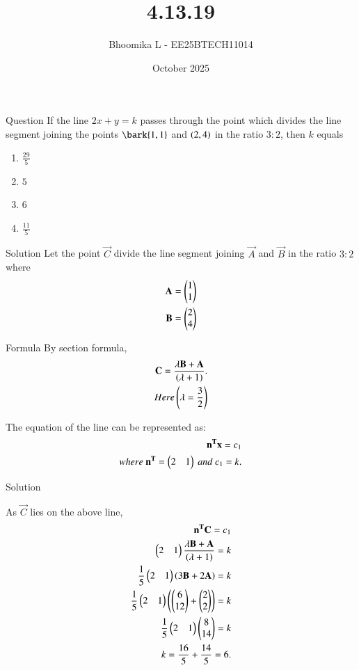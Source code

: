 \documentclass{beamer}
\title %
{4.13.19}
\date{October  2025}
\author %
{Bhoomika L - EE25BTECH11014}
\begin{document}
\frame{\titlepage}
\begin{frame}{Question} If the line $2x + y = k$ passes through the point which divides the line segment joining the points $\bark{1, 1}$ and $\left(2, 4\right)$ in the ratio $3:2$, then $k$ equals
\begin{multicols}
\begin{enumerate}
    \item $\frac{29}{5}$
    \item $5$
    \item $6$
    \item $\frac{11}{5}$
\end{enumerate}
\end{multicols}
\end{frame}

\begin{frame}{Solution}
Let the point $\vec{C}$ divide the line segment joining $\vec{A}$ and $\vec{B}$ in the ratio $3:2$ where
\begin{align}
     \mathbf{A}=\begin{pmatrix}1\\1\end{pmatrix}\\
    \mathbf{B}=\begin{pmatrix}2\\4\end{pmatrix}\\
\end{align}
\end{frame}

\begin{frame}{Formula}
	By section formula,
\begin{align}
   \mathbf{C}=\frac{\lambda\mathbf{B}+\mathbf{A}} {\left(\lambda +1\right)}.\\  
    Here \left(\lambda=\frac{3}{2}\right)
\end{align}

The equation of the line can be represented as:
\begin{align}
    \mathbf{n^T}\mathbf{x}=c_1\\
 where  \ \mathbf{n^T}=\begin{pmatrix}2&1\end{pmatrix} \ and \ c_1=k.
\end{align}
\end{frame}

\begin{frame}{Solution}

As $\vec{C}$ lies on the above line,
\begin{align}
  \mathbf{n^T}\mathbf{C}=c_1\\
 \begin{pmatrix}2&1\end{pmatrix}\frac{\lambda\mathbf{B}+\mathbf{A}} {\left(\lambda +1\right)}=k\\
 \frac{1}{5}\begin{pmatrix}2&1\end{pmatrix}\left(3\mathbf{B}+2\mathbf{A}\right)=k\\
 \frac{1}{5}\begin{pmatrix}2&1\end{pmatrix}\left(\begin{pmatrix}6\\12\end{pmatrix}+\begin{pmatrix}2\\2\end{pmatrix}\right)=k\\
 \frac{1}{5}\begin{pmatrix}2&1\end{pmatrix}\begin{pmatrix}8\\14\end{pmatrix}=k\\
 k=\frac{16}{5}+\frac{14}{5}=6.
 \end{align}
\end{frame}
\end{document}
